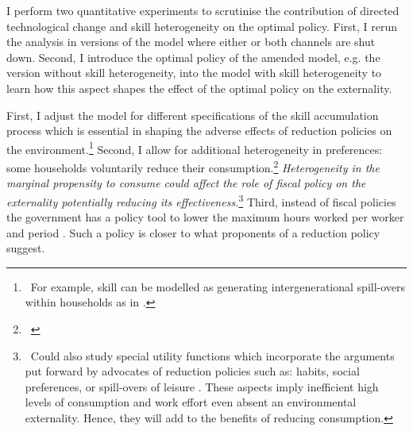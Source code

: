 
I perform two quantitative experiments to scrutinise the contribution of directed technological change and skill heterogeneity on the optimal policy. First, I rerun the analysis in versions of the model where either or both channels are shut down.  Second, I introduce the optimal policy of the amended model, e.g. the  version without skill heterogeneity, into the model with skill heterogeneity to learn how this aspect shapes the effect of the optimal policy on the externality. %

First, I adjust the model for different specifications of the skill accumulation process which is essential in shaping the adverse effects of reduction policies on the environment.\footnote{\ For example, skill can be modelled as generating intergenerational spill-overs within households as in \cite{Borissov2019CarbonDevelopment}.} Second, I allow for additional heterogeneity in preferences: some households voluntarily reduce their consumption.\footnote{\ } \textit{Heterogeneity in the marginal propensity to consume could affect the role of fiscal policy on the externality potentially reducing its effectiveness.}\footnote{\ Could also study special utility functions which incorporate the arguments put forward by advocates of reduction policies such as: habits, social preferences, or  spill-overs of leisure \citep[][\textit{to be read}]{Alesina2005WorkDifferent}. These aspects imply inefficient high levels of consumption and work effort even absent an environmental externality.  Hence, they will add to the benefits of reducing consumption. 
}
Third, instead of fiscal policies the government has a policy tool to lower the maximum hours worked per worker and period \citep[\textit{compare}][]{Alvarez-Cuadrado2007EnvyHours}. Such a policy is closer to what proponents of a reduction policy suggest. %
\\

